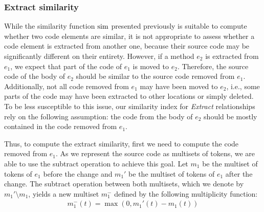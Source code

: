 \subsubsection{Extract similarity}
\label{SecSimX}

While the similarity function $\operatorname{sim}$ presented previously is suitable to compute whether two code elements are similar, it is not appropriate to assess whether a code element is extracted from another one, because their source code may be significantly different on their entirety.
However, if a method $e_2$ is extracted from $e_1$, we expect that part of the code of $e_1$ is moved to $e_2$.
Therefore, the source code of the body of $e_2$ should be similar to the source code removed from $e_1$.
Additionally, not all code removed from $e_1$ may have been moved to $e_2$, i.e., some parts of the code may have been extracted to other locations or simply deleted.
To be less susceptible to this issue, our similarity index for \textit{Extract} relationships rely on the following assumption: the code from the body of $e_2$ should be mostly contained in the code removed from $e_1$.


Thus, to compute the extract similarity, first we need to compute the code removed from $e_1$. As we represent the source code as multisets of tokens, we are able to use the subtract operation to achieve this goal.
Let $m_1$ be the multiset of tokens of $e_1$ before the change and $m_1'$ be the multiset of tokens of $e_1$ after the change.
The subtract operation between both multisets, which we denote by $m_1' \setminus m_1$, yields a new multiset $m_1^-$ defined by the following multiplicity function:
\begin{align}
m_1^-(t) = \max(0, m_1'(t) - m_1(t))
\end{align}

